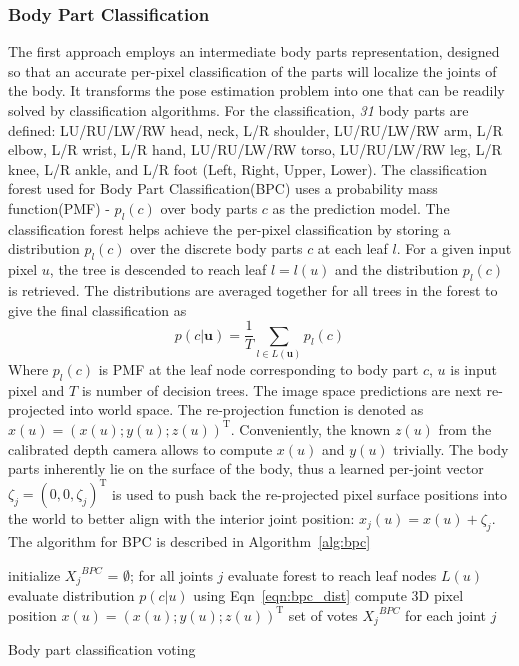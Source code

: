 \subsubsection{Body Part Classification} The first approach employs an intermediate body parts representation, designed so that an accurate per-pixel classification of the parts will localize the joints of the body. It transforms the pose estimation problem into one that can be readily solved by classification algorithms. For the classification, \emph{31} body parts are defined: LU/RU/LW/RW head, neck, L/R shoulder, LU/RU/LW/RW arm, L/R elbow, L/R wrist, L/R hand, LU/RU/LW/RW torso, LU/RU/LW/RW leg, L/R knee, L/R ankle, and L/R foot (Left, Right, Upper, Lower). The classification forest used for Body Part Classification(BPC) uses a probability mass function(PMF) - $p_l(c)$ over body parts $c$ as the prediction model. The classification forest helps achieve the per-pixel classification by storing a distribution $p_l(c)$ over the discrete body parts $c$ at each leaf $l$. For a given input pixel $u$, the tree is descended to reach leaf $l = l(u)$ and the distribution $p_l(c)$ is retrieved. The distributions are averaged together for all trees in the forest to give the final classification as
\begin{equation}
p(c\vert \textbf{u}) = \frac{1}{T}\sum_{l\in L(\textbf{u})} p_l(c)
\label{eqn:bpc_dist}
\end{equation}
Where $p_l(c)$ is PMF at the leaf node corresponding to body part $c$, $u$ is input pixel and $T$ is number of decision trees. The image space predictions are next re-projected into world space. The re-projection function is denoted as $x(u) = (x(u); y(u); z(u))^\text{T}$. Conveniently, the known $z(u)$ from the calibrated depth camera allows to compute $x(u)$ and $y(u)$ trivially. The body parts inherently lie on the surface of the body, thus a learned per-joint vector ${\zeta_j} = (0,0,\zeta_j)^\text{T}$ is used to push back the re-projected pixel surface positions into the world to better align with the interior joint position: $x_j(u) = x(u) + {\zeta_j}$. The algorithm for BPC is described in Algorithm~\ref{alg:bpc} \\

\begin{algorithm}
 initialize ${X_j}^{BPC}$ = $\emptyset$; for all joints $j$ \;
  { 
   evaluate forest to reach leaf nodes $L(u)$ \;
   evaluate distribution $p(c\vert u)$ using Eqn~\ref{eqn:bpc_dist} \;
   compute 3D pixel position $x(u) = (x(u); y(u); z(u))^\text{T}$ \;
  }
 \Return set of votes ${X_j}^{BPC}$ for each joint $j$ \;
 \caption{Body part classification voting}
 \label{alg:bpc}
\end{algorithm}


